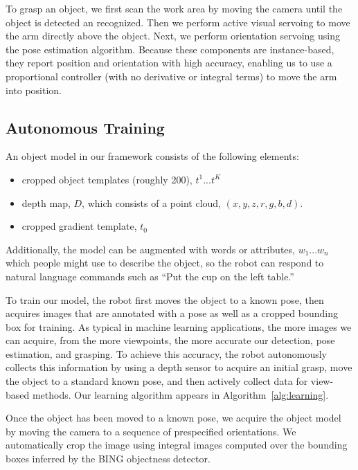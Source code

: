 \documentclass{article}
\begin{document}
To grasp an object, we first scan the work area by moving the camera
until the object is detected an recognized.  Then we perform active
visual servoing to move the arm directly above the object.  Next, we
perform orientation servoing using the pose estimation
algorithm. Because these components are instance-based, they report
position and orientation with high accuracy, enabling us to use a
proportional controller (with no derivative or integral terms) to move
the arm into position.





\subsection{Autonomous Training}
\label{sec:training}

An object model in our framework consists of the following elements:
\begin{itemize}
\item cropped object templates (roughly 200), $t^1 ... t^K$
\item depth map, $D$, which consists of a point cloud, $(x, y, z, r, g, b, d)$.
\item cropped gradient template, $t_0$
\end{itemize}

Additionally, the model can be augmented with words or attributes,
$w_1... w_n$ which people might use to describe the object, so the
robot can respond to natural language commands such as ``Put the cup
on the left table.''

To train our model, the robot first moves the object to a known pose,
then acquires images that are annotated with a pose as well as a
cropped bounding box for training.  As typical in machine learning
applications, the more images we can acquire, from the more
viewpoints, the more accurate our detection, pose estimation, and
grasping.  To achieve this accuracy, the robot autonomously collects
this information by using a depth sensor to acquire an initial grasp,
move the object to a standard known pose, and then actively collect
data for view-based methods.  Our learning algorithm appears in
Algorithm~\ref{alg:learning}.

Once the object has been moved to a known pose, we acquire the object
model by moving the camera to a sequence of prespecified orientations.
We automatically crop the image using integral images computed over
the bounding boxes inferred by the BING objectness detector.
\end{document}
